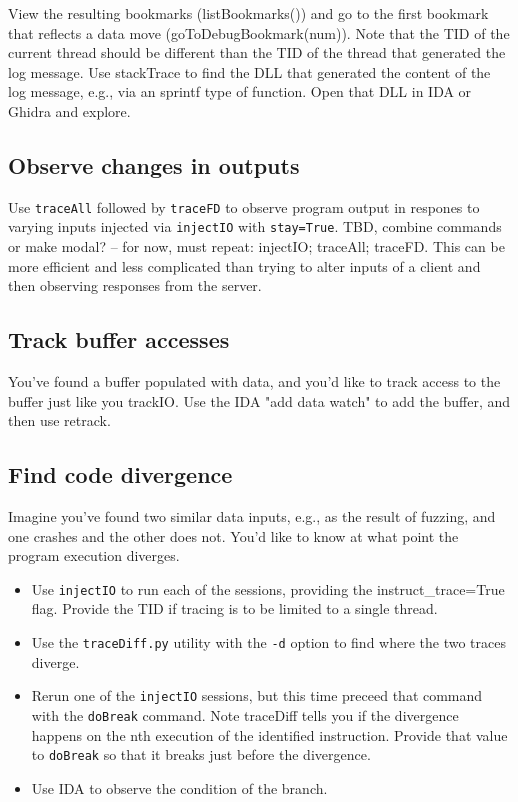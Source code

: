 \documentclass[titlepage]{article}
\begin{document}
View the resulting bookmarks (listBookmarks()) and go to the first bookmark that reflects a data move (goToDebugBookmark(num)).
Note that the TID of the current thread should be different than the TID of the thread that generated the log message.
Use stackTrace to find the DLL that generated the content of the log message, e.g., via an sprintf type of function.
Open that DLL in IDA or Ghidra and explore.

\subsection{Observe changes in outputs}
Use {\tt traceAll} followed by {\tt traceFD} to observe program output in respones to varying inputs injected
via {\tt injectIO} with {\tt stay=True}. TBD, combine commands or make modal? -- for now, must repeat: injectIO;
traceAll; traceFD.  This can be more efficient and less complicated than trying to alter inputs of a client and then
observing responses from the server. 

\subsection{Track buffer accesses}
You've found a buffer populated with data, and you'd like to track access to the buffer just
like you trackIO.  Use the IDA "add data watch" to add the buffer, and then use retrack.

\subsection{Find code divergence}
Imagine you've found two similar data inputs, e.g., as the result of fuzzing, and one
crashes and the other does not.  You'd like to know at what point the program execution diverges.
\begin{itemize}
\item Use {\tt injectIO} to run each of the sessions, providing the instruct\_trace=True flag.  Provide the TID if
tracing is to be limited to a single thread.
\item Use the {\tt traceDiff.py} utility with the {\tt -d} option to find where the two traces diverge.
\item Rerun one of the {\tt injectIO} sessions, but this time preceed that command with the {\tt doBreak} command.
Note traceDiff tells you if the divergence happens on the nth execution of the identified instruction.  Provide that
value to {\tt doBreak} so that it breaks just before the divergence.
\item Use IDA to observe the condition of the branch.
\end{itemize}
\end{document}
